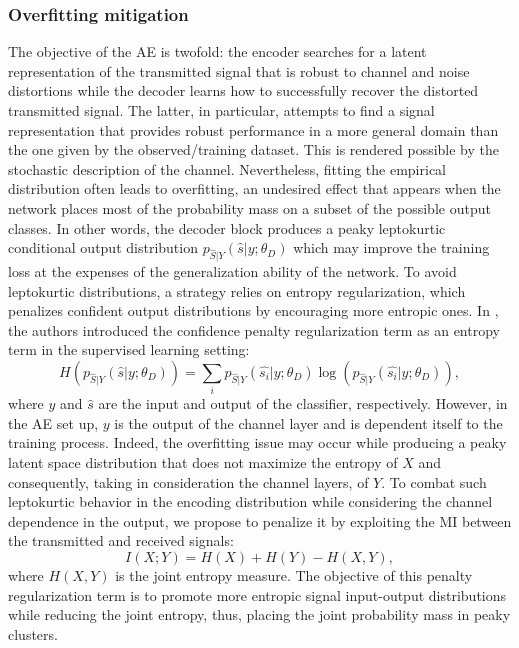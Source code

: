 \subsubsection{Overfitting mitigation}
\label{subsec:autoencoders_overfitting}
The objective of the AE is twofold: the encoder searches for a latent representation of the transmitted signal that is robust to channel and noise distortions while the decoder learns how to successfully recover the distorted transmitted signal. The latter, in particular, attempts to find a signal representation that provides robust performance in a more general domain than the one given by the observed/training dataset. This is rendered possible by the stochastic description of the channel. Nevertheless, fitting the empirical distribution often leads to overfitting, an undesired effect that appears when the network places most of the probability mass on a subset of the possible output classes. In other words, the decoder block produces a peaky leptokurtic conditional output distribution $p_{\hat{S}|Y}(\hat{s}|y;\theta_D)$ which may improve the training loss at the expenses of the generalization ability of the network. To avoid leptokurtic distributions, a strategy relies on entropy regularization, which penalizes confident output distributions by encouraging more entropic ones. In \cite{Pereyra2017}, the authors introduced the confidence penalty regularization term as an entropy term in the supervised learning setting:
\begin{equation}
H(p_{\hat{S}|Y}(\hat{s}|y;\theta_D)) = \sum_{i}{p_{\hat{S}|Y}(\hat{s_i}|y;\theta_D)\log(p_{\hat{S}|Y}(\hat{s_i}|y;\theta_D))},
\label{eq:AE_confidence}
\end{equation}
where $y$ and $\hat{s}$ are the input and output of the classifier, respectively. However, in the AE set up, $y$ is the output of the channel layer and is dependent itself to the training process. Indeed, the overfitting issue may occur while producing a peaky latent space distribution that does not maximize the entropy of $X$ and consequently, taking in consideration the channel layers, of $Y$. To combat such leptokurtic behavior in the encoding distribution while considering the channel dependence in the output, we propose to penalize it by exploiting the MI between the transmitted and received signals:
\begin{equation}
I(X;Y) = H(X) + H(Y) - H(X,Y),
\end{equation}
where $H(X,Y)$ is the joint entropy measure.
The objective of this penalty regularization term is to promote more entropic signal input-output distributions while reducing the joint entropy, thus, placing the joint probability mass in peaky clusters.  

